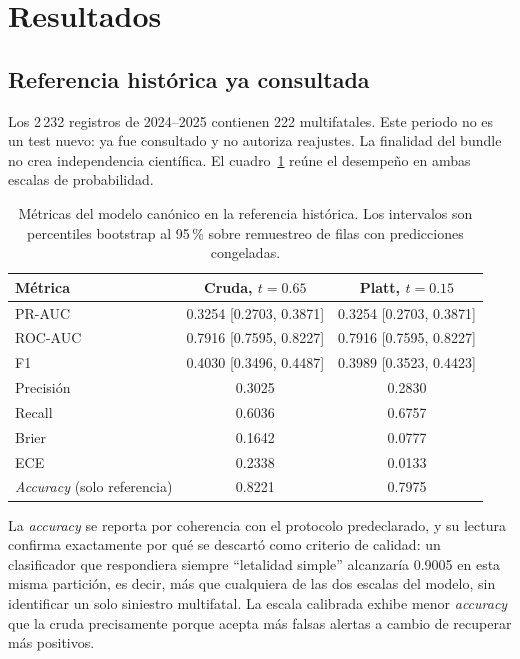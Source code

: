 \section{Resultados}\label{sec:resultados}

\subsection{Referencia histórica ya consultada}
Los 2\,232 registros de 2024--2025 contienen 222 multifatales. Este periodo no es un test nuevo: ya fue consultado y no autoriza reajustes. La finalidad del bundle no crea independencia científica. El cuadro~\ref{tab:metricas-referencia} reúne el desempeño en ambas escalas de probabilidad.

\begin{table}[tbp]\centering\caption{Métricas del modelo canónico en la referencia histórica. Los intervalos son percentiles bootstrap al 95\,\% sobre remuestreo de filas con predicciones congeladas.}\label{tab:metricas-referencia}\begin{tabular}{lcc}\toprule
Métrica & Cruda, $t=0.65$ & Platt, $t=0.15$ \\\midrule
PR-AUC & 0.3254 [0.2703, 0.3871] & 0.3254 [0.2703, 0.3871] \\
ROC-AUC & 0.7916 [0.7595, 0.8227] & 0.7916 [0.7595, 0.8227] \\
F1 & 0.4030 [0.3496, 0.4487] & 0.3989 [0.3523, 0.4423] \\
Precisión & 0.3025 & 0.2830 \\
Recall & 0.6036 & 0.6757 \\
Brier & 0.1642 & 0.0777 \\
ECE & 0.2338 & 0.0133 \\\midrule
\emph{Accuracy} (solo referencia) & 0.8221 & 0.7975 \\\bottomrule
\end{tabular}\end{table}

La \emph{accuracy} se reporta por coherencia con el protocolo predeclarado, y su lectura confirma exactamente por qué se descartó como criterio de calidad: un clasificador que respondiera siempre ``letalidad simple'' alcanzaría 0.9005 en esta misma partición, es decir, más que cualquiera de las dos escalas del modelo, sin identificar un solo siniestro multifatal. La escala calibrada exhibe menor \emph{accuracy} que la cruda precisamente porque acepta más falsas alertas a cambio de recuperar más positivos.

